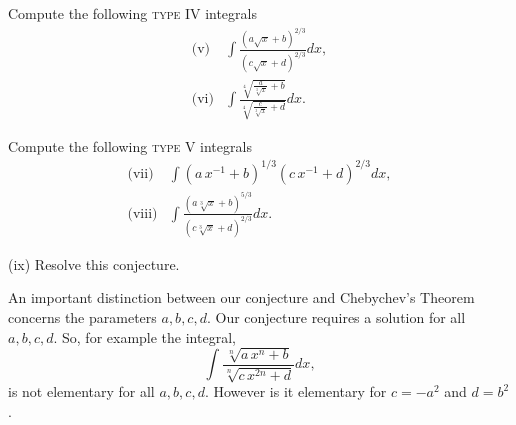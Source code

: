\medskip

Compute the following \textsc{type IV} integrals 
\allowdisplaybreaks
\begin{align*}
\text{(v)} & \int \frac{\left(a \sqrt{x}+b\right)^{2/3}}{\left(c \sqrt{x}+d\right)^{2/3}} dx, \\
\text{(vi)} & \int \frac{\sqrt[4]{\frac{a}{\sqrt[3]{x}}+b}}{\sqrt[4]{\frac{c}{\sqrt[3]{x}}+d}} dx.
\end{align*}

\medskip

Compute the following \textsc{type V} integrals
\allowdisplaybreaks
\begin{align*}
\text{(vii)} & \int \left(a\, x^{-1}+b\right)^{1/3} \left(c\, x^{-1}+d\right)^{2/3} dx, \\
\text{(viii)} & \int \frac{\left(a \sqrt[3]{x}+b\right)^{5/3}}{\left(c \sqrt[3]{x}+d\right)^{2/3}} dx.
\end{align*}

\medskip

(ix) Resolve this conjecture. 

\medskip

An important distinction between our conjecture and Chebychev's Theorem concerns the parameters $a,b,c,d$. Our conjecture requires a solution for all $a,b,c,d$. So, for example the integral,
$$\int \frac{\sqrt[n]{a\, x^n+b}}{\sqrt[n]{c\, x^{2 n} + d}}dx,$$
is not elementary for all $a,b,c,d$. However is it elementary for $c=-a^2$ and $d = b^2$. 


















